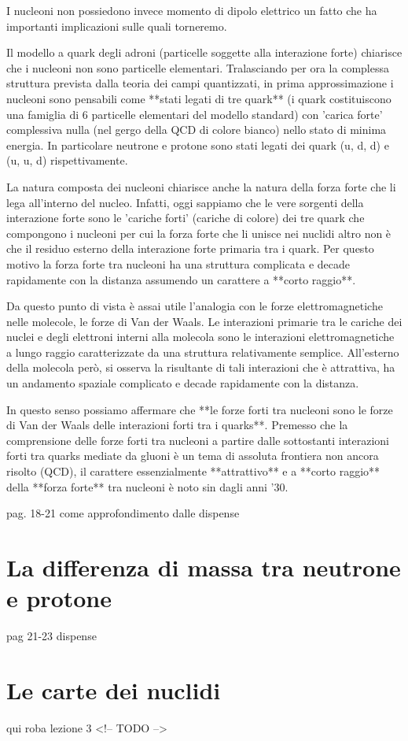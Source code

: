 I nucleoni non possiedono invece momento di dipolo elettrico un fatto che ha importanti implicazioni sulle quali torneremo.

Il modello a quark degli adroni (particelle soggette alla interazione forte) chiarisce che i nucleoni non sono particelle elementari.
Tralasciando per ora la complessa struttura prevista dalla teoria dei campi quantizzati, in prima approssimazione i nucleoni sono pensabili come **stati legati di tre quark** (i quark costituiscono una famiglia di 6 particelle elementari del modello standard) con 'carica forte' complessiva nulla (nel gergo della QCD di colore bianco) nello stato di minima energia. In particolare neutrone e protone sono stati legati dei quark (u, d, d) e (u, u, d) rispettivamente.

La natura composta dei nucleoni chiarisce anche la natura della forza forte che li lega all'interno del nucleo.
Infatti, oggi sappiamo che le vere sorgenti della interazione forte sono le 'cariche forti' (cariche di colore) dei tre quark che compongono i nucleoni per cui la forza forte che li unisce nei nuclidi altro non è che il residuo esterno della interazione forte primaria tra i quark. Per questo motivo la forza forte tra nucleoni ha una struttura complicata e decade rapidamente con la distanza assumendo un carattere a **corto raggio**.

Da questo punto di vista è assai utile l'analogia con le forze elettromagnetiche nelle molecole, le forze di Van der Waals.
Le interazioni primarie tra le cariche dei nuclei e degli elettroni interni alla molecola sono le interazioni elettromagnetiche a lungo raggio caratterizzate da una struttura relativamente semplice. All'esterno della molecola però, si osserva la risultante di tali interazioni che è attrattiva, ha un andamento spaziale complicato e decade rapidamente con la distanza.

In questo senso possiamo affermare che **le forze forti tra nucleoni sono le forze di Van der Waals delle interazioni forti tra i quarks**.
Premesso che la comprensione delle forze forti tra nucleoni a partire dalle sottostanti interazioni forti tra quarks mediate da gluoni è un tema di assoluta frontiera non ancora risolto (QCD), il carattere essenzialmente **attrattivo** e a **corto raggio** della **forza forte** tra nucleoni è noto sin dagli anni '30.

pag. 18-21 come approfondimento dalle dispense

\section{La differenza di massa tra neutrone e protone}\label{sec:la-differenza-di-massa-tra-neutrone-e-protone}

pag 21-23 dispense

\section{Le carte dei nuclidi}

qui roba lezione 3 <!-- TODO -->
